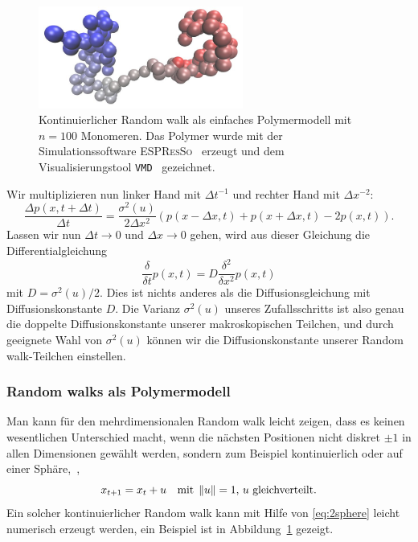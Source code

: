 \begin{figure}
  \centering
  \includegraphics[width=0.6\textwidth]{plots/polymer}
  \caption{Kontinuierlicher Random walk als einfaches Polymermodell mit
    $n=100$ Monomeren. Das Polymer wurde mit der Simulationssoftware
    \textsc{ESPResSo}~\cite{espresso} erzeugt und dem
    Visualisierungstool \texttt{VMD}~\cite{vmd} gezeichnet.}
  \label{fig:contrw}
\end{figure}

Wir multiplizieren nun linker Hand mit $\Delta t^{-1}$ und rechter Hand mit
$\Delta x^{-2}$:
\begin{equation}
  \frac{\Delta p(x, t + \Delta t)}{\Delta t} =
  \frac{\sigma^2(u)}{2\Delta x^2} \left(p(x - \Delta x, t) +
    p(x + \Delta x, t) - 2 p(x, t)\right).
\end{equation}
Lassen wir nun $\Delta t\to 0$ und $\Delta x\to 0$ gehen, wird aus
dieser Gleichung die Differentialgleichung
\begin{equation}
  \frac{\delta}{\delta t} p(x, t) =
  D\frac{\delta^2}{\delta x^2} p(x, t)
\end{equation}
mit $D=\sigma^2(u)/2$.  Dies ist nichts anderes als die
Diffusionsgleichung mit Diffusionskonstante $D$. Die Varianz
$\sigma^2(u)$ unseres Zufallsschritts ist also genau die doppelte
Diffusionskonstante unserer makroskopischen Teilchen, und durch
geeignete Wahl von $\sigma^2(u)$ können wir die Diffusionskonstante
unserer Random walk-Teilchen einstellen.

\subsubsection{Random walks als Polymermodell}

Man kann für den mehrdimensionalen Random walk leicht zeigen, dass es
keinen wesentlichen Unterschied macht, wenn die nächsten Positionen
nicht diskret $\pm 1$ in allen Dimensionen gewählt werden, sondern zum
Beispiel kontinuierlich oder auf einer Sphäre, \dh\,,
\begin{equation}
  x_{t+1} = x_t + u \quad\text{mit}\; \left\lVert{u}\right\rVert=1,\,u\text{ gleichverteilt}.
\end{equation}
Ein solcher kontinuierlicher Random walk kann mit Hilfe von
\eqref{eq:2sphere} leicht numerisch erzeugt werden, ein Beispiel ist
in Abbildung~\ref{fig:contrw} gezeigt.

